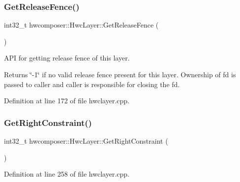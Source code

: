 \subsubsection{\texorpdfstring{Get\+Release\+Fence()}{GetReleaseFence()}}
{\footnotesize\ttfamily int32\+\_\+t hwcomposer\+::\+Hwc\+Layer\+::\+Get\+Release\+Fence (\begin{DoxyParamCaption}{ }\end{DoxyParamCaption})}

A\+PI for getting release fence of this layer. \begin{DoxyReturn}{Returns}
\char`\"{}-\/1\char`\"{} if no valid release fence present for this layer. Ownership of fd is passed to caller and caller is responsible for closing the fd. 
\end{DoxyReturn}


Definition at line 172 of file hwclayer.\+cpp.


\begin{DoxyCode}{0}
\end{DoxyCode}
\mbox{\label{structhwcomposer_1_1HwcLayer_aab827de433954ca578f981e25f340747}} 
\subsubsection{\texorpdfstring{Get\+Right\+Constraint()}{GetRightConstraint()}}
{\footnotesize\ttfamily int32\+\_\+t hwcomposer\+::\+Hwc\+Layer\+::\+Get\+Right\+Constraint (\begin{DoxyParamCaption}{ }\end{DoxyParamCaption})}



Definition at line 258 of file hwclayer.\+cpp.


